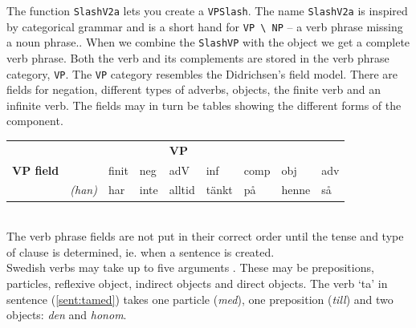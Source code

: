 \documentclass{report}
\begin{document}
The function \verb-SlashV2a- lets you create a \verb-VPSlash-. The name
\verb-SlashV2a- is inspired by categorical grammar and is a short
hand for \verb-VP \ NP- -- a verb phrase missing a
noun phrase..  When we combine the \verb-SlashVP- with the object we
get a complete verb phrase.
Both the verb and its complements are stored in the verb phrase category, \verb-VP-.
The \verb-VP- category resembles the Didrichsen's field model.
There are fields
for negation, different types of adverbs, objects, the finite verb and an infinite verb.
The fields may in turn be tables showing the different forms of the component.\\

\begin{tabular}{|l|llllllll|}
\hline
& & &&\textbf{VP}& & & & \\
\textbf{VP field} && \sc finit& \sc neg& \sc adV & \sc inf& \sc comp& \sc obj& \sc adv \\
\hline
&\emph{(han)} & har &  inte&  alltid&  tänkt&  på&  henne&  så \\
\hline
\end{tabular}\\

\vspace{5mm}
The verb phrase fields are not put in their correct order until the tense and type
of clause is determined, ie. when a sentence is created.\\

Swedish verbs may take up to five arguments \cite[p. 53]{stymne}.
These may be prepositions, particles, reflexive object, indirect objects
and direct objects. 
The verb `ta' in sentence (\ref{sent:tamed}) takes one particle (\emph{med}),
one preposition (\emph{till}) and two objects: \emph{den} and \emph{honom}.
\end{document}
